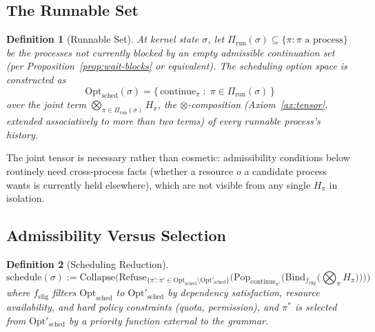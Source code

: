 \documentclass[11pt]{article}
\newtheorem{definition}{Definition}[section]
\begin{document}
\subsection{The Runnable Set}

\begin{definition}[Runnable Set]
\label{def:runnable-set}
At kernel state $\sigma$, let $\Pi_{\mathrm{run}}(\sigma) \subseteq \{\pi : \pi \text{ a process}\}$ be the processes not currently blocked by an empty admissible continuation set (per Proposition~\ref{prop:wait-blocks} or equivalent). The scheduling option space is constructed as
\[
\mathrm{Opt}_{\mathrm{sched}}(\sigma) = \Big\{\, \mathrm{continue}_\pi \;:\; \pi \in \Pi_{\mathrm{run}}(\sigma) \,\Big\}
\]
over the joint term $\bigotimes_{\pi \in \Pi_{\mathrm{run}}(\sigma)} H_\pi$, the $\otimes$-composition (Axiom~\ref{ax:tensor}, extended associatively to more than two terms) of every runnable process's history.
\end{definition}

The joint tensor is necessary rather than cosmetic: admissibility conditions below routinely need cross-process facts (whether a resource $o$ a candidate process wants is currently held elsewhere), which are not visible from any single $H_\pi$ in isolation.

\subsection{Admissibility Versus Selection}

\begin{definition}[Scheduling Reduction]
\label{def:sched-reduction}
\[
\mathrm{schedule}(\sigma) := \mathrm{Collapse}\Big(
\mathrm{Refuse}_{\{\pi' : \pi' \in \mathrm{Opt}_{\mathrm{sched}} \setminus \mathrm{Opt}'_{\mathrm{sched}}\}}\big(
\mathrm{Pop}_{\mathrm{continue}_{\pi^*}}\big(
\mathrm{Bind}_{f_{\mathrm{elig}}}\big(\textstyle\bigotimes_\pi H_\pi\big)
\big)
\big)
\Big)
\]
where $f_{\mathrm{elig}}$ filters $\mathrm{Opt}_{\mathrm{sched}}$ to $\mathrm{Opt}'_{\mathrm{sched}}$ by dependency satisfaction, resource availability, and hard policy constraints (quota, permission), and $\pi^*$ is selected from $\mathrm{Opt}'_{\mathrm{sched}}$ by a priority function external to the grammar.
\end{definition}
\end{document}
